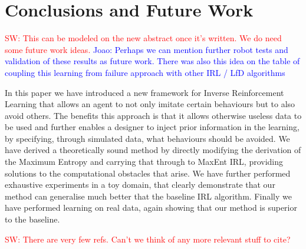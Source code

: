 \documentclass[letterpaper]{article}
\newcommand{\sw}[1]{\textcolor{red}{SW: #1}}
\newcommand{\jm}[1]{\textcolor{blue}{Joao: #1}}
\newcommand{\sw}[1]{}
\newcommand{\jm}[1]{}
\begin{document}
  \vspace{-2mm}

\section{Conclusions and Future Work}

\sw{This can be modeled on the new abstract once it's written.  We do need some future work ideas.} \jm{Perhaps we can mention further robot tests and validation of these results as future work. There was also this idea on the table of coupling this learning from failure approach with other IRL / LfD algorithms}

In this paper we have introduced a new framework for Inverse Reinforcement Learning that allows an agent to not only imitate certain behaviours but to also avoid others. The benefits this approach is that it allows otherwise useless data to be used and further enables a designer to inject prior information in the learning, by specifying, through simulated data, what behaviours should be avoided. We have derived a theoretically sound method by directly modifying the derivation of the Maximum Entropy and carrying that through to MaxEnt IRL, providing solutions to the computational obstacles that arise. We have further performed exhaustive experiments in a toy domain, that clearly demonstrate that our method can generalise much better that the baseline IRL algorithm. Finally we have performed learning on real data, again showing that our method is superior to the baseline.  

\sw{There are very few refs.  Can't we think of any more relevant stuff to cite?}



	
\end{document}
